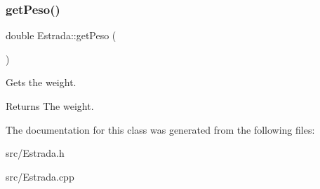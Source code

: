 \subsubsection{\texorpdfstring{getPeso()}{getPeso()}}
{\footnotesize\ttfamily double Estrada\+::get\+Peso (\begin{DoxyParamCaption}{ }\end{DoxyParamCaption})}



Gets the weight. 

\begin{DoxyReturn}{Returns}
The weight. 
\end{DoxyReturn}


The documentation for this class was generated from the following files\+:\begin{DoxyCompactItemize}
\item 
src/Estrada.\+h\item 
src/Estrada.\+cpp\end{DoxyCompactItemize}

